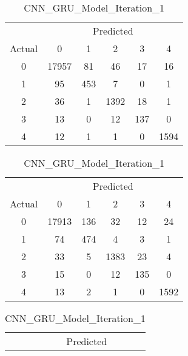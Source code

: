 \begin{table}[ht]
    \centering
    \caption{Comparison of Confusion Matrices for Iteration 1 Models}
    \label{tab:confusion_matrices}
    \begin{minipage}{0.32\textwidth}
        \centering
        \caption*{CNN\_Model\_Iteration\_1}
        \begin{tabular}{cccccc}
            \toprule
            & \multicolumn{5}{c}{Predicted} \\
            \cmidrule(lr){2-6}
            Actual & 0 & 1 & 2 & 3 & 4 \\
            \midrule
            0 & 17957 & 81  & 46  & 17  & 16 \\
            1 & 95    & 453 & 7   & 0   & 1  \\
            2 & 36    & 1   & 1392& 18  & 1  \\
            3 & 13    & 0   & 12  & 137 & 0  \\
            4 & 12    & 1   & 1   & 0   & 1594 \\
            \bottomrule
        \end{tabular}
    \end{minipage}
    \hfill
    \begin{minipage}{0.32\textwidth}
        \centering
        \caption*{CNN\_LSTM\_Model\_Iteration\_1}
        \begin{tabular}{cccccc}
            \toprule
            & \multicolumn{5}{c}{Predicted} \\
            \cmidrule(lr){2-6}
            Actual & 0 & 1 & 2 & 3 & 4 \\
            \midrule
            0 & 17913 & 136 & 32  & 12  & 24 \\
            1 & 74    & 474 & 4   & 3   & 1  \\
            2 & 33    & 5   & 1383& 23  & 4  \\
            3 & 15    & 0   & 12  & 135 & 0  \\
            4 & 13    & 2   & 1   & 0   & 1592 \\
            \bottomrule
        \end{tabular}
    \end{minipage}
    \hfill
    \begin{minipage}{0.32\textwidth}
        \centering
        \caption*{CNN\_GRU\_Model\_Iteration\_1}
        \begin{tabular}{cccccc}
            \toprule
            & \multicolumn{5}{c}{Predicted} \\

\end{tabular}
\end{minipage}
\end{table}
